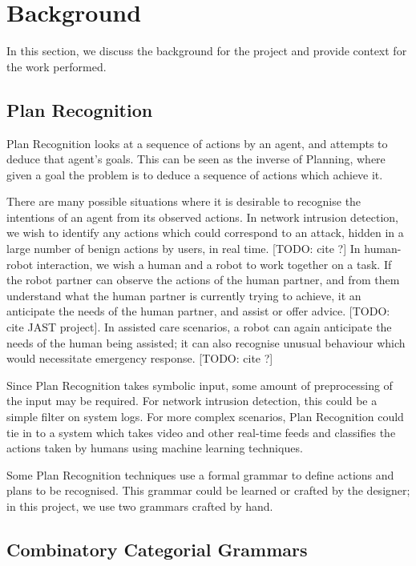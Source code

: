 \chapter{Background}

In this section, we discuss the background for the project and provide context for the work performed.

\section{Plan Recognition}

Plan Recognition looks at a sequence of actions by an agent, and attempts to deduce that agent's goals. This can be seen as the inverse of Planning, where given a goal the problem is to deduce a sequence of actions which achieve it. 

There are many possible situations where it is desirable to recognise the intentions of an agent from its observed actions. In network intrusion detection, we wish to identify any actions which could correspond to an attack, hidden in a large number of benign actions by users, in real time. [TODO: cite ?] In human-robot interaction, we wish a human and a robot to work together on a task. If the robot partner can observe the actions of the human partner, and from them understand what the human partner is currently trying to achieve, it an anticipate the needs of the human partner, and assist or offer advice. [TODO: cite JAST project]. In assisted care scenarios, a robot can again anticipate the needs of the human being assisted; it can also recognise unusual behaviour which would necessitate emergency response. [TODO: cite ?]

Since Plan Recognition takes symbolic input, some amount of preprocessing of the input may be required. For network intrusion detection, this could be a simple filter on system logs. For more complex scenarios, Plan Recognition could tie in to a system which takes video and other real-time feeds and classifies the actions taken by humans using machine learning techniques.

Some Plan Recognition techniques use a formal grammar to define actions and plans to be recognised. This grammar could be learned or crafted by the designer; in this project, we use two grammars crafted by hand.

\section{Combinatory Categorial Grammars}

